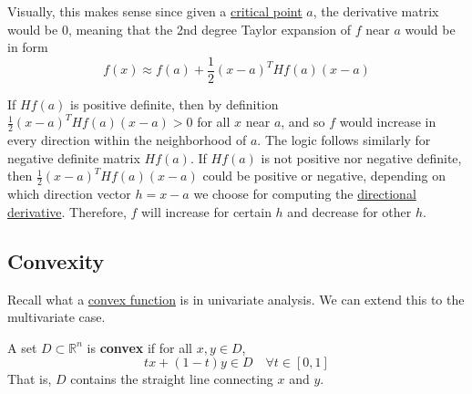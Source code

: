   Visually, this makes sense since given a \hyperref[real-def:critical-point]{critical point} $a$, the derivative matrix would be $0$, meaning that the 2nd degree Taylor expansion of $f$ near $a$ would be in form
	\begin{equation}
  	f(x) \approx f(a) + \frac{1}{2} (x - a)^T H f(a) (x - a)
	\end{equation}

  If $H f(a)$ is positive definite, then by definition $\frac{1}{2} (x - a)^T H f(a) (x - a) > 0$ for all $x$ near $a$, and so $f$ would increase in every direction within the neighborhood of $a$. The logic follows similarly for negative definite matrix $H f(a)$. If $H f(a)$ is not positive nor negative definite, then $\frac{1}{2} (x - a)^T H f(a) (x - a)$ could be positive or negative, depending on which direction vector $h = x - a$ we choose for computing the \hyperref[def:directional-derivative]{directional derivative}. Therefore, $f$ will increase for certain $h$ and decrease for other $h$. 

\subsection{Convexity}

	Recall what a \hyperref[real-def:convex_functions]{convex function} is in univariate analysis. We can extend this to the multivariate case. 

	\begin{definition}
	  \label{def:convex-set}
	  A set $D \subset \mathbb{R}^n$ is \textbf{convex} if for all $x, y \in D$, 
		\begin{equation}
			tx + (1 - t) y \in D \quad \forall t \in [0, 1]
		\end{equation}
		That is, $D$ contains the straight line connecting $x$ and $y$. 
	\end{definition}

